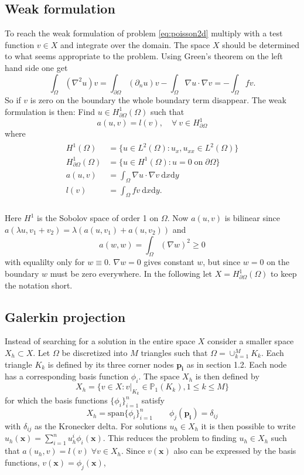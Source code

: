 \documentclass[paper=a4, fontsize=11pt]{scrartcl} %
\begin{document}
\subsection{Weak formulation}
To reach the weak formulation of problem \eqref{eq:poisson2d} multiply with a test function $v\in X$ and integrate over the domain. The space $X$ should be determined to what seems appropriate to the problem. Using Green's theorem on the left hand side one get 
\[\int_{\Omega}  (\nabla^2u)v = \int_{\partial\Omega} (\partial_n u) v -\int_{\Omega} \nabla u \cdot \nabla v = -\int_{\Omega} f v.\]
So if $v$ is zero on the boundary the whole boundary term disappear. The weak formulation is then: Find $u\in H^1_{\partial\Omega}(\Omega)$ such that
\[a(u,v) = l(v), \quad \forall \: v \in H^1_{\partial\Omega}\]
where 
\begin{eqnarray}
\begin{aligned}
H^1(\Omega) &= \{u \in L^2(\Omega) : u_x, u_{xx} \in L^2(\Omega)\} \\
H^1_{\partial\Omega}(\Omega) &= \{u\in H^1(\Omega) : u=0 \; \mathrm{on} \;  \partial\Omega\} \\
a(u,v) &= \int_{\Omega} \nabla u\cdot\nabla v \: \mathrm{d}x\mathrm{d}y\\
l(v) &= \int_{\Omega} f v \: \mathrm{d}x\mathrm{d}y.\\
\end{aligned}
\label{eq:poisson2d:Weak}
\end{eqnarray}

Here $H^1$ is the Sobolov space of order 1 on $\Omega$. Now $a(u,v)$ is bilinear since $a(\lambda u,v_1+v_2)=\lambda\left(a(u,v_1)+a(u,v_2)\right)$ and
\[a(w,w)=\int_{\Omega} (\nabla w)^2 \geq 0\] 
with equalilty only for $w\equiv 0$. $\nabla w=0$ gives constant $w$, but since $w=0$ on the boundary $w$ must be zero everywhere. In the following let $X=H^1_{\partial\Omega}(\Omega)$ to keep the notation short.

\subsection{Galerkin projection}
Instead of searching for a solution in the entire space $X$ consider a smaller space $X_h \subset X$. Let $\Omega$ be discretized into $M$ triangles such that $\Omega = \cup^M_{k=1} K_k$. Each triangle $K_k$ is defined by its three corner nodes $\mathbf{p_i}$ as in section 1.2. Each node has a corresponding basis function $\phi_i$. The space $X_h$ is then defined by
\[ X_h = \{v \in X : v|_{K_k} \in \mathbb{P}_1(K_k),1\leq k\leq M\}\] 
for which the basis functions $\{\phi_i\}^n_{i=1}$ satisfy
\[ X_h = \mathrm{span}\{\phi_i\}^n_{i=1} \qquad \phi_j(\mathbf{p_i})=\delta_{ij}\]
with $\delta_{ij}$ as the Kronecker delta. For solutions $u_h\in X_h$ it is then possible to write $u_h(\mathbf{x})=\sum^n_{i=1} u^i_h\phi_i(\mathbf{x})$. This reduces the problem to finding $u_h \in X_h$ such that $a(u_h,v)=l(v) \; \forall v\in X_h$.
Since $v(\mathbf{x})$ also can be expressed by the basis functions, $v(\mathbf{x})=\phi_j(\mathbf{x})$,
\end{document}
